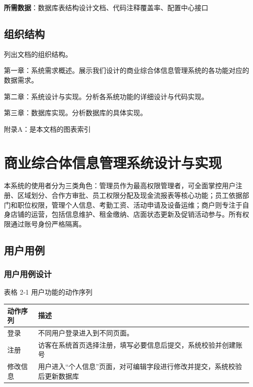 \documentclass[]{article}
\begin{document}
\textbf{所需数据}：数据库表结构设计文档、代码注释覆盖率、配置中心接口

\hypertarget{ux7ec4ux7ec7ux7ed3ux6784}{%
\subsection{组织结构}\label{ux7ec4ux7ec7ux7ed3ux6784}}

列出文档的组织结构。

第一章：系统需求概述。展示我们设计的商业综合体信息管理系统的各功能对应的数据需求。

第二章：系统设计与实现。分析各系统功能的详细设计与代码实现。

第三章：数据库实现。分析数据库的具体实现。

附录A：是本文档的图表索引

\hypertarget{ux5546ux4e1aux7efcux5408ux4f53ux4fe1ux606fux7ba1ux7406ux7cfbux7edfux8bbeux8ba1ux4e0eux5b9eux73b0}{%
\section{商业综合体信息管理系统设计与实现}\label{ux5546ux4e1aux7efcux5408ux4f53ux4fe1ux606fux7ba1ux7406ux7cfbux7edfux8bbeux8ba1ux4e0eux5b9eux73b0}}

本系统的使用者分为三类角色：管理员作为最高权限管理者，可全面掌控用户注册、区域划分、合作方审批、员工权限分配及现金流报表等核心功能；员工依据部门和职位权限，管理个人信息、考勤工资、活动申请及设备运维；商户则专注于自身店铺的运营，包括信息维护、租金缴纳、店面状态更新及促销活动参与。所有权限通过账号身份严格隔离。

\hypertarget{ux7528ux6237ux7528ux4f8b}{%
\subsection{ 用户用例}\label{ux7528ux6237ux7528ux4f8b}}

\hypertarget{ux7528ux6237ux7528ux4f8bux8bbeux8ba1}{%
\subsubsection{用户用例设计}\label{ux7528ux6237ux7528ux4f8bux8bbeux8ba1}}

\protect\hypertarget{_Toc153186375}{}{\protect\hypertarget{_Toc394245026}{}{}}表格
2‑1 用户功能的动作序列

\begin{longtable}[]{@{}ll@{}}
\toprule
动作序列 & 描述\tabularnewline
\midrule
\endhead
登录 & 不同用户登录进入到不同页面。\tabularnewline
注册 &
访客在系统首页选择注册，填写必要信息后提交，系统校验并创建账号\tabularnewline
修改信息 &
用户进入``个人信息''页面，对可编辑字段进行修改并提交，系统校验后更新数据库\tabularnewline
\bottomrule
\end{longtable}
\end{document}
